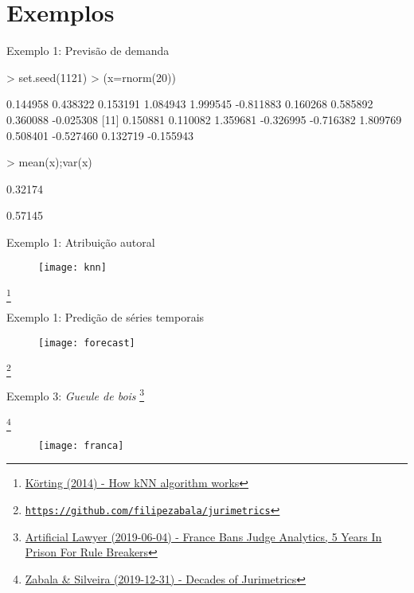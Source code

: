 \documentclass{beamer}
\newcommand\blfootnote[1]{%
  \begingroup
  \renewcommand\thefootnote{}\footnote{#1}%
  \addtocounter{footnote}{-1}%
  \endgroup
}
\begin{document}
\section{Exemplos}
\begin{frame}[fragile]{Exemplo 1: Previsão de demanda}
\begin{Schunk}
\begin{Sinput}
> set.seed(1121)
> (x=rnorm(20))
\end{Sinput}
\begin{Soutput}
 [1]  0.144958  0.438322  0.153191  1.084943  1.999545 -0.811883  0.160268  0.585892  0.360088 -0.025308
[11]  0.150881  0.110082  1.359681 -0.326995 -0.716382  1.809769  0.508401 -0.527460  0.132719 -0.155943
\end{Soutput}
\begin{Sinput}
> mean(x);var(x)
\end{Sinput}
\begin{Soutput}
[1] 0.32174
\end{Soutput}
\begin{Soutput}
[1] 0.57145
\end{Soutput}
\end{Schunk}
\end{frame}



\begin{frame}{Exemplo 1: Atribuição autoral}
\begin{figure}
\texttt{[image: knn]}
\end{figure}
\blfootnote{\tiny{\href{https://www.youtube.com/watch?v=UqYde-LULfs}{Körting (2014) - How kNN algorithm works}}}
\end{frame}

\begin{frame}{Exemplo 1: Predição de séries temporais}
\begin{figure}
\texttt{[image: forecast]}
\end{figure}
\blfootnote{\tiny{\href{https://github.com/filipezabala/jurimetrics}{\nolinkurl{https://github.com/filipezabala/jurimetrics}}}}
\end{frame}

\begin{frame}{Exemplo 3: \textit{Gueule de bois}}
\blfootnote{\tiny{\href{https://www.artificiallawyer.com/2019/06/04/france-bans-judge-analytics-5-years-in-prison-for-rule-breakers/}{Artificial Lawyer (2019-06-04) - France Bans Judge Analytics, 5 Years In Prison For Rule Breakers}}}
\blfootnote{\tiny{\href{https://arxiv.org/abs/2001.00476}{Zabala \& Silveira (2019-12-31) - Decades of Jurimetrics}}}
\begin{figure}
\texttt{[image: franca]}
\end{figure}
\end{frame}
\end{document}
